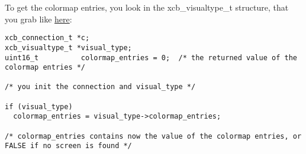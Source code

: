\documentclass[12pt,oneside,titlepage]{book}
\begin{document}
\begin{enumerate}
\begin{enumerate}
\begin{enumerate}
      To get the colormap entries, you look in the {xcb\_visualtype\_t}
      structure, that you grab like
      \protect\hyperlink{DefaultVisual}{here}:

\begin{verbatim}
xcb_connection_t *c;
xcb_visualtype_t *visual_type;
uint16_t          colormap_entries = 0;  /* the returned value of the colormap entries */

/* you init the connection and visual_type */

if (visual_type)
  colormap_entries = visual_type->colormap_entries;

/* colormap_entries contains now the value of the colormap entries, or FALSE if no screen is found */
\end{verbatim}
    \end{enumerate}
  \end{enumerate}
\end{enumerate}
\end{document}
